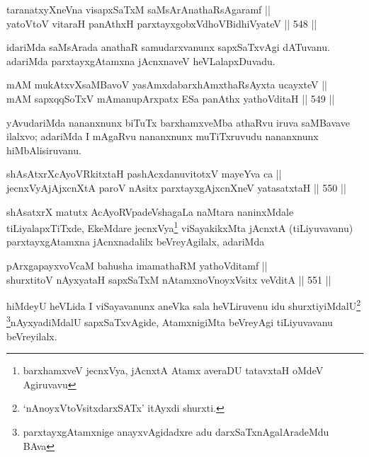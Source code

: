 
\begin{shl}
taranatxyXneVna visapxSaTxM saMsArAnathaRsAgaramf || \\
yatoV\s toV vitaraH panAthxH parxtayxgobxVdhoV\s BidhiVyateV \hfill || 548 ||  
\end{shl}

\begin{artha}
idariMda saMsArada anathaR samudarxvanunx sapxSaTxvAgi dATuvanu.
adariMda parxtayxgAtamxna jAcnxnaveV heVLalapxDuvadu.
\end{artha}

\begin{shl}
mAM mukAtxvX\s saMBavoV yasAmxdabarxhAmxthaRsAyxta ucayxteV || \\
mAM sapxqqSoTxV mAmanupArxpatx ESa panAthx yathoVditaH \hfill || 549 ||  
\end{shl}

\begin{artha}
yAvudariMda nananxnunx biTuTx barxhamxveMba athaRvu iruva saMBavave
ilalxvo; adariMda I mAgaRvu nananxnunx muTiTxruvudu nananxnunx hiMbAlisiruvanu.
\end{artha}


\begin{shl}
shAsAtxrXcAyoVRkitxtaH pashAcxdanuvitotxV mayeYva ca || \\
jecnxVyAjAjxcnXtA paroV nAsitx parxtayxgAjxcnXneV yatasatxtaH \hfill || 550 ||  
\end{shl}

\begin{artha}
shAsatxrX matutx AcAyoRVpadeVshagaLa naMtara naninxMdale
tiLiyalapxTiTxde, EkeMdare jecnxVya\footnote{barxhamxveV jecnxVya,
jAcnxtA Atamx averaDU tatavxtaH oMdeV Agiruvavu} viSayakikxMta jAcnxtA
(tiLiyuvavanu) parxtayxgAtamxna jAcnxnadalilx beVreyAgilalx, adariMda 
\end{artha}

\begin{shl}
pArxgapayxvoVcaM bahusha imamathaRM yathoVditamf || \\
shurxtitoV nAyxyataH sapxSaTxM nA\s \s tamxnoV\s noyxV\s sitx veVditA \hfill || 551 ||  
\end{shl}

\begin{artha}
hiMdeyU heVLida  I viSayavanunx aneVka sala heVLiruvenu idu
shurxtiyiMdalU\footnote{`nAnoyxVtoV\s sitxdarxSATx' itAyxdi
shurxti.} \footnote{parxtayxgAtamxnige anayxvAgidadxre adu
darxSaTxnAgalAradeMdu BAva}nAyxyadiMdalU sapxSaTxvAgide,
AtamxnigiMta beVreyAgi tiLiyuvavanu beVreyilalx.
\end{artha}

